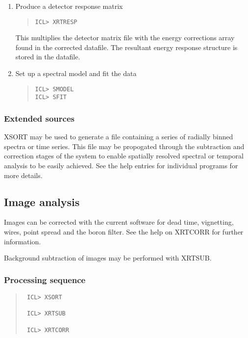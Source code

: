 \documentclass{book}
\renewcommand{\_}{{\tt\char'137}}     %
\begin{document}
\begin{enumerate}
\begin{quote}
\begin{verbatim}
\begin{quote}\begin{verbatim}
ICL> XRTCORR
\end{verbatim}\end{quote}
This will correct the spectrum for the energy independent
effects, dead time and wires. In addition it produces an
array of energy dependent correction factors within the
datafile. These are used as the effective area at each energy
for this datafile.
\item Produce a detector response matrix
\begin{quote}\begin{verbatim}
ICL> XRTRESP
\end{verbatim}\end{quote}
This multiplies the detector matrix file with the energy
corrections array found in the corrected datafile. The
resultant energy response structure is stored in the datafile.

\item Set up a spectral model and fit the data
\begin{quote}\begin{verbatim}
ICL> SMODEL
ICL> SFIT
\end{verbatim}\end{quote}
\end{enumerate}
\subsubsection{Extended sources}
XSORT may be used to generate a file containing a series of radially
binned spectra or time series. This file may be propogated through the
subtraction and correction stages of the system to enable spatially
resolved spectral or temporal analysis to be easily achieved. See the
help entries for individual programs for more details.

\subsection{Image analysis}
Images can be corrected with the current software for dead time,
vignetting, wires, point spread and the boron filter. See the help on
XRTCORR for further information.

Background subtraction of images may be performed with XRTSUB.

\subsubsection{Processing sequence}
\begin{quote}\begin{verbatim}
 ICL> XSORT

 ICL> XRTSUB

 ICL> XRTCORR
\end{verbatim}\end{quote}
\end{document}
